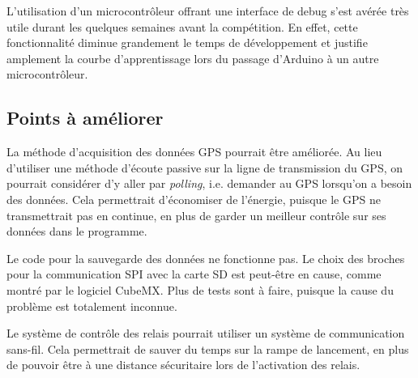 L'utilisation d'un microcontrôleur offrant une interface de debug s'est avérée
très utile durant les quelques semaines avant la compétition. En effet, cette
fonctionnalité diminue grandement le temps de développement et justifie
amplement la courbe d'apprentissage lors du passage d'Arduino à un autre
microcontrôleur.

\subsection{Points à améliorer}

La méthode d'acquisition des données GPS pourrait être améliorée. Au lieu
d'utiliser une méthode d'écoute passive sur la ligne de transmission du GPS, on
pourrait considérer d'y aller par \textit{polling}, i.e. demander au GPS
lorsqu'on a besoin des données. Cela permettrait d'économiser de l'énergie,
puisque le GPS ne transmettrait pas en continue, en plus de garder un meilleur
contrôle sur ses données dans le programme.
\\
\par
Le code pour la sauvegarde des données ne fonctionne pas. Le choix des broches
pour la communication SPI avec la carte SD est peut-être en cause, comme montré
par le logiciel CubeMX. Plus de tests sont à faire, puisque la cause du
problème est totalement inconnue.
\\
\par
Le système de contrôle des relais pourrait utiliser un système de communication
sans-fil. Cela permettrait de sauver du temps sur la rampe de lancement, en
plus de pouvoir être à une distance sécuritaire lors de l'activation des relais.
\\
\par
